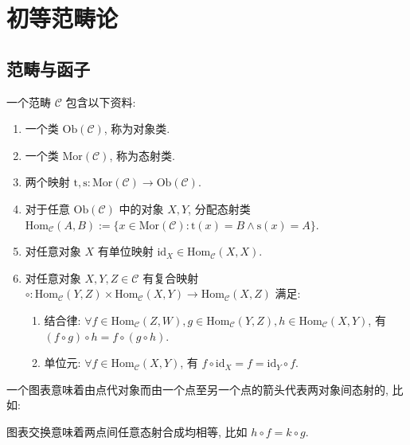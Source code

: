 \section{初等范畴论}

\subsection{范畴与函子}

\begin{definition}[范畴]
    \label {definition:category}
    一个范畴 \(\mathcal{C}\) 包含以下资料:

    \begin{enumerate}
        \item 一个类 \(\mathrm{Ob} (\mathcal{C})\), 称为对象类.
        \item 一个类 \(\mathrm{Mor} (\mathcal{C})\), 称为态射类.
        \item 两个映射 \(\mathrm{t},\mathrm{s} : \mathrm{Mor} (\mathcal{C}) \to \mathrm{Ob} (\mathcal{C})\).
        \item 对于任意 \(\mathrm{Ob} (\mathcal{C})\) 中的对象 \(X,Y\), 分配态射类 \(\mathrm{Hom}_{\mathcal{C}} (A,B) := \{x \in \mathrm{Mor}(\mathcal{C}):\mathrm{t}(x) = B \land \mathrm{s}(x) = A\}\).
        \item 对任意对象 \(X\) 有单位映射 \(\mathrm{id}_X \in \mathrm{Hom}_{\mathcal{C}} (X,X)\).
        \item 对任意对象 \(X,Y,Z \in \mathcal{C}\) 有复合映射 \(\circ : \mathrm{Hom}_{\mathcal{C}} (Y,Z) \times \mathrm{Hom}_{\mathcal{C}} (X,Y) \to \mathrm{Hom}_{\mathcal{C}} (X,Z)\) 满足:
        \begin{enumerate}
            \item 结合律: \(\forall f \in \mathrm{Hom}_{\mathcal{C}} (Z,W), g \in \mathrm{Hom}_{\mathcal{C}} (Y,Z), h \in \mathrm{Hom}_{\mathcal{C}} (X,Y)\), 有 \((f \circ g) \circ h = f \circ (g \circ h)\).
            \item 单位元: \(\forall f \in \mathrm{Hom}_{\mathcal{C}} (X,Y)\), 有 \(f \circ \mathrm{id}_X = f = \mathrm{id}_Y \circ f\).
        \end{enumerate}
    \end{enumerate}
\end{definition}

\begin{definition}[交换图表]
    一个图表意味着由点代对象而由一个点至另一个点的箭头代表两对象间态射的, 比如:
    \begin{center}
    \end{center}
    图表交换意味着两点间任意态射合成均相等, 比如 \(h \circ f = k \circ g\).
\end{definition}

